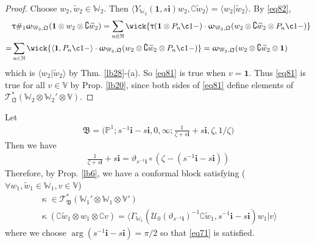 \documentclass[11pt,b5paper,notitlepage]{article}
\theoremstyle{definition}
\theoremstyle{plain}
\newcommand{\fk}{\mathfrak}
\newcommand{\mc}{\mathcal}
\newcommand{\wtd}{\widetilde}
\newcommand{\id}{\mathbf{1}}
\newcommand{\bk}[1]{\langle {#1}\rangle}
\newcommand{\scr}{\mathscr}
\newcommand{\im}{\mathbf{i}}
\newcommand{\Co}{\complement}
\newcommand{\Vbb}{\mathbb V}
\newcommand{\Wbb}{\mathbb W}
\newcommand{\Nbb}{\mathbb N}
\newcommand{\Pbb}{\mathbb P}
\numberwithin{equation}{section}
\begin{document}
\begin{proof}
Choose $w_2,\wtd w_2\in\Wbb_2$. Then $\bk{Y_{\Wbb_2}(\id,s\im)w_2,\Co \wtd w_2}=\bk{w_2|\wtd w_2}$. By \eqref{eq82},
\begin{align*}
&\uptau\#_1\upomega_{\Wbb_2,\fk Q}(\id \otimes w_2\otimes\Co\wtd w_2)=\sum_{n\in\Nbb}\wick{\uptau(\id\otimes P_n \c1 -) \cdot\upomega_{\Wbb_2,\fk Q}(w_2\otimes\Co\wtd w_2\otimes P_n \c1 -)}\\
=&\sum_{n\in\Nbb}\wick{\langle\id, P_n \c1 -\rangle \cdot\upomega_{\Wbb_2,\fk Q}(w_2\otimes\Co\wtd w_2\otimes P_n \c1 -)}=\upomega_{\Wbb_2,\fk Q}(w_2\otimes\Co\wtd w_2\otimes \id)
\end{align*}
which is $\bk{w_2|\wtd w_2}$ by Thm. \ref{lb28}-(a). So \eqref{eq81} is true when $v=\id$. Thus \eqref{eq81} is true for all $v\in\Vbb$ by Prop. \ref{lb20}, since both sides of \eqref{eq81} define elements of $\scr T_{\fk Q}^*(\Wbb_2\otimes\Wbb_2'\otimes\Vbb)$.
\end{proof}





Let
\begin{align*}
\fk B=\Big(\Pbb^1;s^{-1}\im-s\im,0,\infty;\frac 1{\zeta+s\im}+s\im,\zeta,1/\zeta\Big)
\end{align*}
Then we have
\begin{align*}
\frac 1{\zeta+s\im}+s\im=\vartheta_{s^{-1}\im}\circ(\zeta-(s^{-1}\im-s\im))
\end{align*}
Therefore, by Prop. \ref{lb6}, we have a conformal block satisfying ($\forall w_1,\wtd w_1\in\Wbb_1,v\in\Vbb$)
\begin{gather}
\upkappa\in\scr T_{\fk B}^*(\Wbb_1'\otimes\Wbb_1\otimes\Vbb')\nonumber\\
\upkappa(\Co\wtd w_1\otimes w_1\otimes \Co v)=\bk{\Gamma_{\Wbb_1}(\mc U_0(\vartheta_{s^{-1}\im})^{-1}\Co\wtd w_1,s^{-1}\im-s\im)w_1|v} \label{eq86}
\end{gather}
where we choose $\arg(s^{-1}\im-s\im)=\pi/2$ so that \eqref{eq71} is satisfied.
\end{document}
